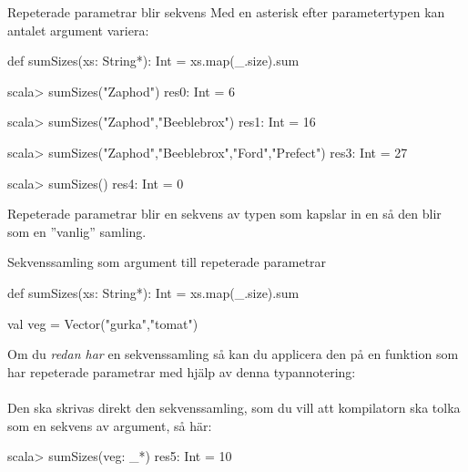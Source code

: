 


\begin{Slide}{Repeterade parametrar blir sekvens}\SlideFontSmall
Med en asterisk efter parametertypen kan antalet argument variera:
\begin{Code}[basicstyle=\fontsize{10}{12}\selectfont\ttfamily]
def sumSizes(xs: String*): Int = xs.map(_.size).sum
\end{Code}
\begin{REPLnonum}
scala> sumSizes("Zaphod")
res0: Int = 6

scala> sumSizes("Zaphod","Beeblebrox")
res1: Int = 16

scala> sumSizes("Zaphod","Beeblebrox","Ford","Prefect")
res3: Int = 27

scala> sumSizes()
res4: Int = 0
\end{REPLnonum}
Repeterade parametrar  blir en sekvens av typen  som kapslar in en  så den blir som en ''vanlig'' samling.
\end{Slide}


\begin{Slide}{Sekvenssamling som argument till repeterade parametrar}
\begin{Code}[basicstyle=\fontsize{10}{12}\selectfont\ttfamily]
def sumSizes(xs: String*): Int = xs.map(_.size).sum

val veg = Vector("gurka","tomat")
\end{Code}
Om du \emph{redan har} en sekvenssamling så kan du applicera den på en funktion
som har repeterade parametrar med hjälp av denna typannotering:\\
{\vspace{0.5em}\Large\code{: _* }} \\
\vspace{1em}Den ska skrivas direkt  den sekvenssamling, som du vill att kompilatorn ska tolka som en sekvens av argument, så här:
\begin{REPLnonum}
scala> sumSizes(veg: _*)
res5: Int = 10
\end{REPLnonum}

\end{Slide}
